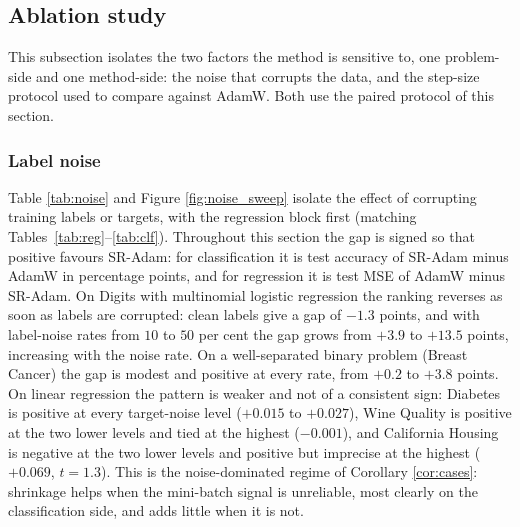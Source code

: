 \documentclass[pdflatex,sn-mathphys-num]{sn-jnl}%
\theoremstyle{thmstyleone}%
\theoremstyle{thmstyletwo}%
\theoremstyle{thmstylethree}%
\begin{document}
\begin{table}[t]
\centering
\caption{Classification test accuracy (per cent), clean training labels. Models: logistic regression, one-hidden-layer MLP, and GCN \cite{kipf2017}. Bold $=$ higher accuracy.}
\label{tab:clf}

\end{table}

\subsection{Ablation study}
This subsection isolates the two factors the method is sensitive to, one problem-side and one method-side: the noise that corrupts the data, and the step-size protocol used to compare against AdamW. Both use the paired protocol of this section.
\subsubsection{Label noise}

Table \ref{tab:noise} and Figure \ref{fig:noise_sweep} isolate the effect of corrupting training labels or targets, with the regression block first (matching Tables~\ref{tab:reg}--\ref{tab:clf}). Throughout this section the gap is signed so that positive favours SR-Adam: for classification it is test accuracy of SR-Adam minus AdamW in percentage points, and for regression it is test MSE of AdamW minus SR-Adam. On Digits with multinomial logistic regression the ranking reverses as soon as labels are corrupted: clean labels give a gap of $-1.3$ points, and with label-noise rates from $10$ to $50$ per cent the gap grows from $+3.9$ to $+13.5$ points, increasing with the noise rate. On a well-separated binary problem (Breast Cancer) the gap is modest and positive at every rate, from $+0.2$ to $+3.8$ points. On linear regression the pattern is weaker and not of a consistent sign: Diabetes is positive at every target-noise level ($+0.015$ to $+0.027$), Wine Quality is positive at the two lower levels and tied at the highest ($-0.001$), and California Housing is negative at the two lower levels and positive but imprecise at the highest ($+0.069$, $t=1.3$). This is the noise-dominated regime of Corollary \ref{cor:cases}: shrinkage helps when the mini-batch signal is unreliable, most clearly on the classification side, and adds little when it is not.
\end{document}
